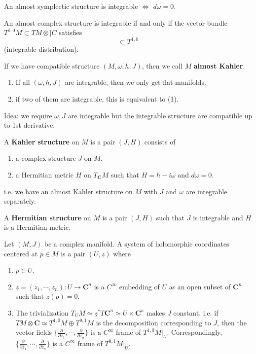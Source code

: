 \documentclass[
11pt, %
letterpaper， %
oneside, %
headinclude,footinclude, %
BCOR5mm, %
]{scrartcl}
\newcommand{\C}{{\mathbf{C}}}
\newcommand{\bfs}{\textbf}
\begin{document}
\begin{thm}[Darboux]
	An almost symplectic structure is integrable $\Leftrightarrow$ $d\omega=0$.
\end{thm}
\begin{thm}
	An almost complex structure is integrable if and only if the vector bundle $T^{1,0}M\subset TM\otimes |C$ satisfies
	\begin{equation*}
	[T^{1,0}, T^{1,0}] \subset T^{1,0}
	\end{equation*}
	(integrable distribution).
\end{thm}

If we have compatible structure $(M,\omega, h, J)$, then we call $M$ \bfs{almost Kahler}.
\begin{rem}
	\begin{enumerate}
		\item If all $(\omega, h, J)$ are integrable, then we only get flat manifolds.
		\item if two of them are integrable, this is equivalent to (1).
	\end{enumerate}
Idea: we require $\omega, J$ are integrable but the integrable structure are compatible up to 1st derivative.
\end{rem}

\begin{definition}
	A \bfs{Kahler structure} on $M$ is a pair $(J,H)$ consists of
	\begin{enumerate}
		\item a complex structure $J$ on $M$.
		\item a Hermitian metric $H$ on $T_{\C}M$ such that $H=h-i\omega$ and $d\omega=0$.
	\end{enumerate}
i.e. we have an almost Kahler structure on $M$ with $J$ and $\omega$ are integrable separately.
\end{definition}
\begin{definition}
	A \bfs{Hermitian structure} on $M$ is a pair $(J,H)$ such that $J$ is integrable and $H$ is a Hermitian metric.
\end{definition}

Let $(M,J)$ be a complex manifold. A system of holomorphic coordinates centered at $p\in M$ is a pair $(U,\underline{z})$ where
\begin{enumerate}
	\item $p\in U$.
	\item $\underline{z}=(z_1,\cdots, z_n):U \to \C^n$ is a $C^{\infty}$ embedding of $U$ as an open subset of $\C^n$ such that $\underline{z}(p)=0$.
	\item The trivialization $T_UM\simeq \underline{z}^*T\C^n\simeq U\times \C^n $ makes $J$ constant, i.e. if $TM\otimes \C \simeq T^{1,0}M\oplus T^{0,1} M$ is the decomposition corresponding to $J$, then the vector fields $\{\frac{\partial}{\partial z_1},\cdots, \frac{\partial}{\partial z_n} \}$ is a $C^{\infty}$ frame of $T^{1,0}M|_U$. Correspondingly, $\{\frac{\partial}{\partial \overline{z}_1},\cdots, \frac{\partial}{\partial \overline{z}_n} \}$ is a $C^{\infty}$ frame of $T^{0,1}M|_U$.
\end{enumerate}
\end{document}
